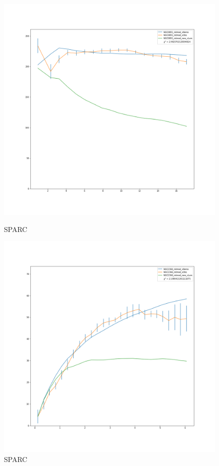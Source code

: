 \documentclass[reprint,%
 amsmath,amssymb,
 aps,
]{revtex4-1}
\begin{document}
\begin{figure} 
\centering
\begin{minipage}{0.5\textwidth}
  \includegraphics[width=.8\linewidth]{figures/NGC0891_rotmod_XueSofue.png}
\caption{ SPARC\cite{2016Lelli}}
\label{fig:2841}
\end{minipage}
\begin{minipage}{0.5\textwidth}
  \includegraphics[width=.8\linewidth]{figures/NGC2366_rotmod_XueSofue.png}
\caption{ SPARC\cite{2016Lelli}}
\label{fig:2915}
\end{minipage}
\end{figure}
\end{document}
